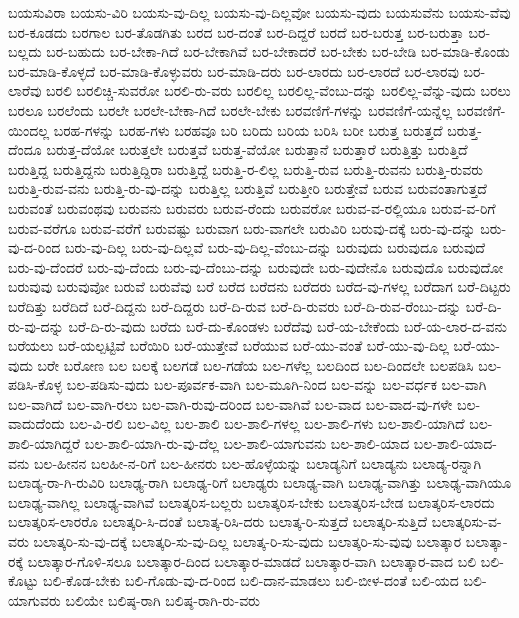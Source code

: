 {ಬಯಸುವಿರಾ
ಬಯಸು-ವಿರಿ
ಬಯಸು-ವು-ದಿಲ್ಲ
ಬಯಸು-ವು-ದಿಲ್ಲವೋ
ಬಯಸು-ವುದು
ಬಯಸುವೆನು
ಬಯಸು-ವೆವು
ಬರ-ಕೂಡದು
ಬರಗಾಲ
ಬರ-ತೊಡಗಿತು
ಬರದ
ಬರ-ದಂತೆ
ಬರ-ದಿದ್ದರೆ
ಬರದೆ
ಬರ-ಬರುತ್ತ
ಬರ-ಬರುತ್ತಾ
ಬರ-ಬಲ್ಲದು
ಬರ-ಬಹುದು
ಬರ-ಬೇಕಾ-ಗಿದೆ
ಬರ-ಬೇಕಾಗಿವೆ
ಬರ-ಬೇಕಾದರೆ
ಬರ-ಬೇಕು
ಬರ-ಬೇಡಿ
ಬರ-ಮಾಡಿ-ಕೊಂಡು
ಬರ-ಮಾಡಿ-ಕೊಳ್ಳದೆ
ಬರ-ಮಾಡಿ-ಕೊಳ್ಳುವರು
ಬರ-ಮಾಡಿ-ದರು
ಬರ-ಲಾರದು
ಬರ-ಲಾರದೆ
ಬರ-ಲಾರವು
ಬರ-ಲಾರೆವು
ಬರಲಿ
ಬರಲಿಚ್ಚಿ-ಸುವರೋ
ಬರಲಿ-ರು-ವರು
ಬರಲಿಲ್ಲ
ಬರಲಿಲ್ಲ-ವೆಂಬು-ದನ್ನು
ಬರಲಿಲ್ಲ-ವೆನ್ನು-ವುದು
ಬರಲು
ಬರಲೂ
ಬರಲೆಂದು
ಬರಲೇ
ಬರಲೇ-ಬೇಕಾ-ಗಿದೆ
ಬರಲೇ-ಬೇಕು
ಬರವಣಿಗೆ-ಗಳನ್ನು
ಬರವಣಿಗೆ-ಯನ್ನೆಲ್ಲ
ಬರವಣಿಗೆ-ಯಿಂದಲ್ಲ
ಬರಹ-ಗಳನ್ನು
ಬರಹ-ಗಳು
ಬರಹವೂ
ಬರಿ
ಬರಿದು
ಬರಿಯ
ಬರಿಸಿ
ಬರೀ
ಬರುತ್ತ
ಬರುತ್ತದೆ
ಬರುತ್ತ-ದೆಂದೂ
ಬರುತ್ತ-ದೆಯೋ
ಬರುತ್ತಲೇ
ಬರುತ್ತವೆ
ಬರುತ್ತ-ವೆಯೋ
ಬರುತ್ತಾನೆ
ಬರುತ್ತಾರೆ
ಬರುತ್ತಿತ್ತು
ಬರುತ್ತಿದೆ
ಬರುತ್ತಿದ್ದ
ಬರುತ್ತಿದ್ದನು
ಬರುತ್ತಿದ್ದಿರಾ
ಬರುತ್ತಿದ್ದೆ
ಬರುತ್ತಿ-ರ-ಲಿಲ್ಲ
ಬರುತ್ತಿ-ರುವ
ಬರುತ್ತಿ-ರುವನು
ಬರುತ್ತಿ-ರುವರು
ಬರುತ್ತಿ-ರುವ-ವನು
ಬರುತ್ತಿ-ರು-ವು-ದನ್ನು
ಬರುತ್ತಿಲ್ಲ
ಬರುತ್ತಿವೆ
ಬರುತ್ತೀರಿ
ಬರುತ್ತೇವೆ
ಬರುವ
ಬರುವಂತಾಗುತ್ತದೆ
ಬರುವಂತೆ
ಬರುವಂಥವು
ಬರುವನು
ಬರುವರು
ಬರುವ-ರೆಂದು
ಬರುವರೋ
ಬರುವ-ವ-ರಲ್ಲಿಯೂ
ಬರುವ-ವ-ರಿಗೆ
ಬರುವ-ವರೆಗೂ
ಬರುವ-ವರೆಗೆ
ಬರುವಷ್ಟು
ಬರುವಾಗ
ಬರು-ವಾಗಲೇ
ಬರುವಿರಿ
ಬರುವು-ದಕ್ಕೆ
ಬರು-ವು-ದನ್ನು
ಬರು-ವು-ದ-ರಿಂದ
ಬರು-ವು-ದಿಲ್ಲ
ಬರು-ವು-ದಿಲ್ಲವೆ
ಬರು-ವು-ದಿಲ್ಲ-ವೆಂಬು-ದನ್ನು
ಬರುವುದು
ಬರುವುದೂ
ಬರುವುದೆ
ಬರು-ವು-ದೆಂದರೆ
ಬರು-ವು-ದೆಂದು
ಬರು-ವು-ದೆಂಬು-ದನ್ನು
ಬರುವುದೇ
ಬರು-ವುದೇನೊ
ಬರುವುದೊ
ಬರುವುದೋ
ಬರುವುವು
ಬರುವುವೋ
ಬರುವೆ
ಬರುವೆವು
ಬರೆ
ಬರೆದ
ಬರೆದನು
ಬರೆದರು
ಬರೆದ-ವು-ಗಳಲ್ಲ
ಬರೆದಾಗ
ಬರೆ-ದಿಟ್ಟರು
ಬರೆದಿತ್ತು
ಬರೆದಿದೆ
ಬರೆ-ದಿದ್ದನು
ಬರೆ-ದಿದ್ದರು
ಬರೆ-ದಿ-ರುವ
ಬರೆ-ದಿ-ರುವರು
ಬರೆ-ದಿ-ರುವ-ರೆಂಬು-ದನ್ನು
ಬರೆ-ದಿ-ರು-ವು-ದನ್ನು
ಬರೆ-ದಿ-ರು-ವುದು
ಬರೆದು
ಬರೆ-ದು-ಕೊಂಡಳು
ಬರೆದೆವು
ಬರೆ-ಯ-ಬೇಕೆಂದು
ಬರೆ-ಯ-ಲಾರ-ದ-ವನು
ಬರೆಯಲು
ಬರೆ-ಯಲ್ಪಟ್ಟಿವೆ
ಬರೆಯಿರಿ
ಬರೆ-ಯುತ್ತೇವೆ
ಬರೆಯುವ
ಬರೆ-ಯು-ವಂತೆ
ಬರೆ-ಯು-ವು-ದಿಲ್ಲ
ಬರೆ-ಯು-ವುದು
ಬರೇ
ಬರೋಣ
ಬಲ
ಬಲಕ್ಕೆ
ಬಲಗಡೆ
ಬಲ-ಗಡೆಯ
ಬಲ-ಗಳೆಲ್ಲ
ಬಲದಿಂದ
ಬಲ-ದಿಂದಲೇ
ಬಲಪಡಿಸಿ
ಬಲ-ಪಡಿಸಿ-ಕೊಳ್ಳ
ಬಲ-ಪಡಿಸು-ವುದು
ಬಲ-ಪೂರ್ವಕ-ವಾಗಿ
ಬಲ-ಮೂಗಿ-ನಿಂದ
ಬಲ-ವನ್ನು
ಬಲ-ವರ್ಧಕ
ಬಲ-ವಾಗಿ
ಬಲ-ವಾಗಿದೆ
ಬಲ-ವಾಗಿ-ರಲು
ಬಲ-ವಾಗಿ-ರುವು-ದರಿಂದ
ಬಲ-ವಾಗಿವೆ
ಬಲ-ವಾದ
ಬಲ-ವಾದ-ವು-ಗಳೇ
ಬಲ-ವಾದುದೆಂದು
ಬಲ-ವಿ-ರಲಿ
ಬಲ-ವಿಲ್ಲ
ಬಲ-ಶಾಲಿ
ಬಲ-ಶಾಲಿ-ಗಳಲ್ಲ
ಬಲ-ಶಾಲಿ-ಗಳು
ಬಲ-ಶಾಲಿ-ಯಾಗಿದೆ
ಬಲ-ಶಾಲಿ-ಯಾಗಿದ್ದರೆ
ಬಲ-ಶಾಲಿ-ಯಾಗಿ-ರು-ವು-ದೆಲ್ಲ
ಬಲ-ಶಾಲಿ-ಯಾಗುವನು
ಬಲ-ಶಾಲಿ-ಯಾದ
ಬಲ-ಶಾಲಿ-ಯಾದ-ವನು
ಬಲ-ಹೀನನ
ಬಲಹೀ-ನ-ರಿಗೆ
ಬಲ-ಹೀನರು
ಬಲ-ಹೊಳ್ಳೆಯನ್ನು
ಬಲಾಡ್ಯನಿಗೆ
ಬಲಾಡ್ಯನು
ಬಲಾಡ್ಯ-ರನ್ನಾಗಿ
ಬಲಾಡ್ಯ-ರಾ-ಗಿ-ರುವಿರಿ
ಬಲಾಢ್ಯ-ರಾಗಿ
ಬಲಾಢ್ಯ-ರಿಗೆ
ಬಲಾಢ್ಯರು
ಬಲಾಢ್ಯ-ವಾಗಿ
ಬಲಾಢ್ಯ-ವಾಗಿತ್ತು
ಬಲಾಢ್ಯ-ವಾಗಿಯೂ
ಬಲಾಢ್ಯ-ವಾಗಿಲ್ಲ
ಬಲಾಢ್ಯ-ವಾಗಿವೆ
ಬಲಾತ್ಕರಿಸ-ಬಲ್ಲರು
ಬಲಾತ್ಕರಿಸ-ಬೇಕು
ಬಲಾತ್ಕರಿಸ-ಬೇಡ
ಬಲಾತ್ಕರಿಸ-ಲಾರದು
ಬಲಾತ್ಕರಿಸ-ಲಾರರೊ
ಬಲಾತ್ಕರಿ-ಸಿ-ದಂತೆ
ಬಲಾತ್ಕ-ರಿಸಿ-ದರು
ಬಲಾತ್ಕ-ರಿ-ಸುತ್ತದೆ
ಬಲಾತ್ಕರಿ-ಸುತ್ತಿದೆ
ಬಲಾತ್ಕರಿಸು-ವ-ವರು
ಬಲಾತ್ಕರಿ-ಸು-ವು-ದಕ್ಕೆ
ಬಲಾತ್ಕರಿ-ಸು-ವು-ದಿಲ್ಲ
ಬಲಾತ್ಕ-ರಿ-ಸು-ವುದು
ಬಲಾತ್ಕರಿ-ಸು-ವುವು
ಬಲಾತ್ಕಾರ
ಬಲಾತ್ಕಾ-ರಕ್ಕೆ
ಬಲಾತ್ಕಾರ-ಗೊಳಿ-ಸಲೂ
ಬಲಾತ್ಕಾರ-ದಿಂದ
ಬಲಾತ್ಕಾರ-ಮಾಡದೆ
ಬಲಾತ್ಕಾರ-ವಾಗಿ
ಬಲಾತ್ಕಾರ-ವಾದ
ಬಲಿ
ಬಲಿ-ಕೊಟ್ಟು
ಬಲಿ-ಕೊಡ-ಬೇಕು
ಬಲಿ-ಗೊಡು-ವು-ದ-ರಿಂದ
ಬಲಿ-ದಾನ-ಮಾಡಲು
ಬಲಿ-ಬೀಳ-ದಂತೆ
ಬಲಿ-ಯದ
ಬಲಿ-ಯಾಗುವರು
ಬಲಿಯೇ
ಬಲಿಷ್ಠ-ರಾಗಿ
ಬಲಿಷ್ಠ-ರಾಗಿ-ರು-ವರು
}
